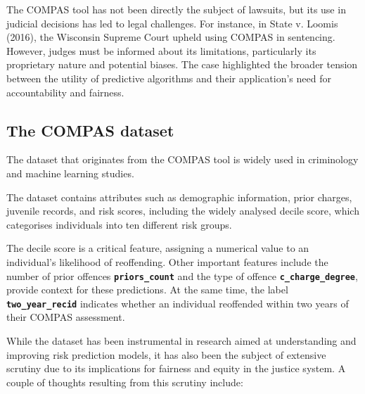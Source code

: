 \documentclass[conference]{IEEEtran}
\begin{document}
	The COMPAS tool has not been directly the subject of lawsuits, but its use in judicial decisions has led to legal challenges. For instance, in State v. Loomis (2016), the Wisconsin Supreme Court upheld using COMPAS in sentencing. However, judges must be informed about its limitations, particularly its proprietary nature and potential biases. The case highlighted the broader tension between the utility of predictive algorithms and their application's need for accountability and fairness.
	
	\subsection{The COMPAS dataset}
	
	The dataset that originates from the COMPAS tool is widely used in criminology and machine learning studies. 
	
	The dataset contains attributes such as demographic information, prior charges, juvenile records, and risk scores, including the widely analysed decile score, which categorises individuals into ten different risk groups. 
	
	The decile score is a critical feature, assigning a numerical value to an individual's likelihood of reoffending. Other important features include the number of prior offences \textbf{\texttt{priors\_count}} and the type of offence \textbf{\texttt{c\_charge\_degree}}, provide context for these predictions. At the same time, the label \textbf{\texttt{two\_year\_recid}} indicates whether an individual reoffended within two years of their COMPAS assessment.
	
	While the dataset has been instrumental in research aimed at understanding and improving risk prediction models, it has also been the subject of extensive scrutiny due to its implications for fairness and equity in the justice system. A couple of thoughts resulting from this scrutiny include:
	
\end{document}
